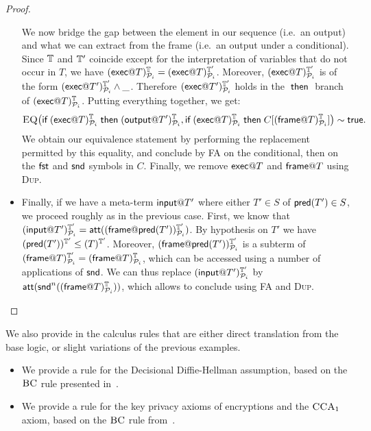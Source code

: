 \begin{proof}
\begin{itemize}
     We now bridge the gap between the element in our
     sequence (i.e.\ an output) and what we can extract from the frame
     (i.e.\ an output under a conditional).
     Since $\mathbb{T}$ and $\mathbb{T}'$ coincide except for the interpretation
     of variables that do not occur in $T$, we have
     $(\textsf{exec} @ T)^{\mathbb{T}}_{\mathcal{P}_i} =
     (\textsf{exec} @ T)^{\mathbb{T}'}_{\mathcal{P}_i}$.
     Moreover, $(\textsf{exec} @ T)^{\mathbb{T}'}_{\mathcal{P}_i}$ is of the form $(\textsf{exec} @ T')^{\mathbb{T}'}_{\mathcal{P}_i} \wedge \_$. Therefore $(\textsf{exec} @ T')^{\mathbb{T}'}_{\mathcal{P}_i}$ holds in the $\;\textsf{then}\;$ branch of $(\textsf{exec} @ T)^{\mathbb{T}}_{\mathcal{P}_i}$. Putting everything together, we get:
     \[
       \textsc{EQ}\bigl(
       \textsf{if}\; (\textsf{exec} @ T)^{\mathbb{T}}_{\mathcal{P}_i} \;\textsf{then}\;
       (\textsf{output} @ T')^{\mathbb{T}}_{\mathcal{P}_i},
       \textsf{if}\; (\textsf{exec} @ T)^{\mathbb{T}}_{\mathcal{P}_i} \;\textsf{then}\;
       C[(\textsf{frame} @ T)^{\mathbb{T}}_{\mathcal{P}_i}]
       \bigr)
       \sim \textsf{true}.
     \]
     We obtain our equivalence statement
     by performing the replacement permitted by this equality,
     and conclude by \textsc{FA} on the conditional, then on the
     $\mathsf{fst}$ and $\mathsf{snd}$ symbols in $C$. Finally, we remove $\textsf{exec} @ T$ and
     $\textsf{frame} @ T$ using \textsc{Dup}.
     
   \item Finally, if we have a meta-term $\textsf{input} @ T'$ where either $T' \in S$
     of $\textsf{pred}(T') \in S$, we proceed roughly as in the previous case. First, we know that
     $(\textsf{input} @ T')^{\mathbb{T}'}_{\mathcal{P}_i} =
      \mathsf{att}((\textsf{frame} @ \textsf{pred}(T'))^{\mathbb{T}'}_{\mathcal{P}_i})$.
     By hypothesis on $T'$ we have
     $(\textsf{pred}(T'))^{\mathbb{T}'}_{} \leq (T)^{\mathbb{T}'}_{}$.
     Moreover, $(\textsf{frame} @ \textsf{pred}(T'))^{\mathbb{T}'}_{\mathcal{P}_i}$
     is a subterm of $(\textsf{frame} @ T)^{\mathbb{T}'}_{\mathcal{P}_i} =
     (\textsf{frame} @ T)^{\mathbb{T}}_{\mathcal{P}_i}$,
     which can be accessed using a number of applications of $\mathsf{snd}$.
     We can thus replace
     $(\textsf{input} @ T')^{\mathbb{T}'}_{\mathcal{P}_i}$
     by $\mathsf{att}(\mathsf{snd}^n((\textsf{frame} @ T)^{\mathbb{T}}_{\mathcal{P}_i}))$,
     which allows to conclude using \textsc{FA} and \textsc{Dup}.
     \qedhere
  \end{itemize}
\end{proof}

We also provide in the calculus rules that are either direct translation from the base logic, or slight variations of the previous examples.
\begin{itemize}
\item We provide a rule for the Decisional Diffie-Hellman assumption, based on the $\textsc{BC}$ rule presented in~\cite{bana2019verification}.
\item We provide a rule for the key privacy axioms of encryptions and the $\textsc{CCA}_1$ axiom, based on the $\textsc{BC}$ rule from~\cite{Bana:2014:CCS:2660267.2660276}.

\end{itemize}


